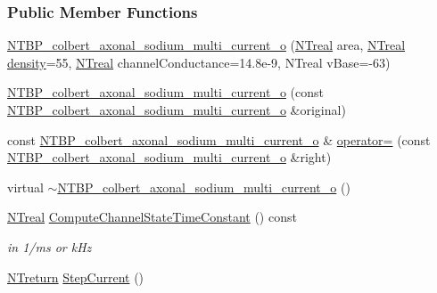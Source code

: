 \subsubsection*{Public Member Functions}
\begin{DoxyCompactItemize}
\item 
\hyperlink{class_n_t_b_p__colbert__axonal__sodium__multi__current__o_a3edb71631fea87fc8d25e147623d6c76}{NTBP\_\-colbert\_\-axonal\_\-sodium\_\-multi\_\-current\_\-o} (\hyperlink{nt__types_8h_a814a97893e9deb1eedcc7604529ba80d}{NTreal} area, \hyperlink{nt__types_8h_a814a97893e9deb1eedcc7604529ba80d}{NTreal} \hyperlink{class_n_t_b_p__multi__current__o_a82138baaa276b09c13038ca1fd6f08a7}{density}=55, \hyperlink{nt__types_8h_a814a97893e9deb1eedcc7604529ba80d}{NTreal} channelConductance=14.8e-\/9, NTreal vBase=-\/63)
\item 
\hyperlink{class_n_t_b_p__colbert__axonal__sodium__multi__current__o_a0b92e7cf4cbfdf2abbf8fe33088002aa}{NTBP\_\-colbert\_\-axonal\_\-sodium\_\-multi\_\-current\_\-o} (const \hyperlink{class_n_t_b_p__colbert__axonal__sodium__multi__current__o}{NTBP\_\-colbert\_\-axonal\_\-sodium\_\-multi\_\-current\_\-o} \&original)
\item 
const \hyperlink{class_n_t_b_p__colbert__axonal__sodium__multi__current__o}{NTBP\_\-colbert\_\-axonal\_\-sodium\_\-multi\_\-current\_\-o} \& \hyperlink{class_n_t_b_p__colbert__axonal__sodium__multi__current__o_ab814c4fb1f2e20a35e44327e410db8d0}{operator=} (const \hyperlink{class_n_t_b_p__colbert__axonal__sodium__multi__current__o}{NTBP\_\-colbert\_\-axonal\_\-sodium\_\-multi\_\-current\_\-o} \&right)
\item 
virtual \hyperlink{class_n_t_b_p__colbert__axonal__sodium__multi__current__o_a9096267c54df52a6db2f602cfb31fb21}{$\sim$NTBP\_\-colbert\_\-axonal\_\-sodium\_\-multi\_\-current\_\-o} ()
\item 
\hyperlink{nt__types_8h_a814a97893e9deb1eedcc7604529ba80d}{NTreal} \hyperlink{class_n_t_b_p__colbert__axonal__sodium__multi__current__o_aae1d556b6649e4ba84e4db48b9b04a41}{ComputeChannelStateTimeConstant} () const 
\begin{DoxyCompactList}\small\item\em in 1/ms or kHz \item\end{DoxyCompactList}\item 
\hyperlink{nt__types_8h_ab9564ee8f091e809d21b8451c6683c53}{NTreturn} \hyperlink{class_n_t_b_p__colbert__axonal__sodium__multi__current__o_a12016147e186693dbc3ccf7818967b96}{StepCurrent} ()

\end{DoxyCompactItemize}
